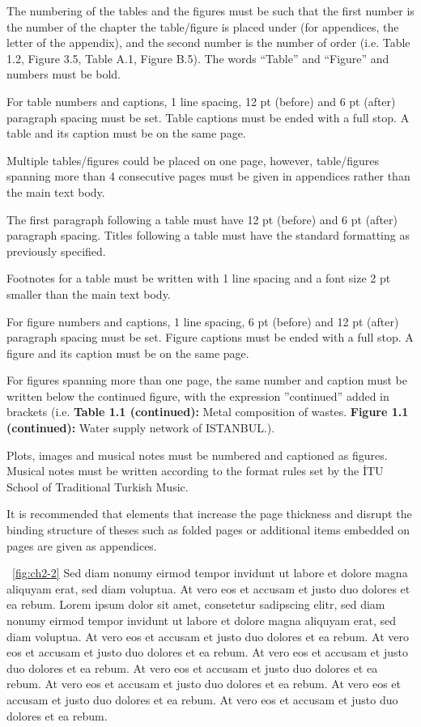 The numbering of the tables and the figures must be such that the first number is the number of the chapter the table/figure is placed under (for appendices, the letter of the appendix), and the second number is the number of order (i.e. Table 1.2, Figure 3.5, Table A.1, Figure B.5). The words “Table” and “Figure” and numbers must be bold.

For table numbers and captions, 1 line spacing, 12 pt (before) and 6 pt (after) paragraph spacing must be set. Table captions must be ended with a full stop. A table and its caption must be on the same page. \vfill\phantom{.}

Multiple tables/figures could be placed on one page, however, table/figures spanning more than 4 consecutive pages must be given in appendices rather than the main text body.

The first paragraph following a table must have 12 pt (before) and 6 pt (after) paragraph spacing. Titles following a table must have the standard formatting as previously specified. 

Footnotes for a table must be written with 1 line spacing and a font size 2 pt smaller than the main text body. 

For figure numbers and captions, 1 line spacing, 6 pt (before) and 12 pt (after) paragraph spacing must be set. Figure captions must be ended with a full stop. A figure and its caption must be on the same page. 

For figures spanning more than one page, the same number and caption must be written below the continued figure, with the expression ”continued” added in brackets (i.e. \textbf{Table 1.1 (continued):} Metal composition of wastes. \textbf{Figure 1.1 (continued):} Water supply network of ISTANBUL.).

Plots, images and musical notes must be numbered and captioned as figures. Musical notes must be written according to the format rules set by the İTU School of Traditional Turkish Music. 

It is recommended that elements that increase the page thickness and disrupt the binding structure of theses such as  folded pages or additional items embedded on pages are given as appendices.

\figurename\ \ref{fig:ch2-2} Sed diam nonumy eirmod tempor invidunt ut labore et dolore magna aliquyam erat, sed diam voluptua. At vero eos et accusam et justo duo dolores et ea rebum. Lorem ipsum dolor sit amet, consetetur sadipscing elitr, sed diam nonumy eirmod tempor invidunt ut labore et dolore magna aliquyam erat, sed diam voluptua. At vero eos et accusam et justo duo dolores et ea rebum. At vero eos et accusam et justo duo dolores et ea rebum. At vero eos et accusam et justo duo dolores et ea rebum. At vero eos et accusam et justo duo dolores et ea rebum. At vero eos et accusam et justo duo dolores et ea rebum. At vero eos et accusam et justo duo dolores et ea rebum. At vero eos et accusam et justo duo dolores et ea rebum. \vfill\phantom{.}

